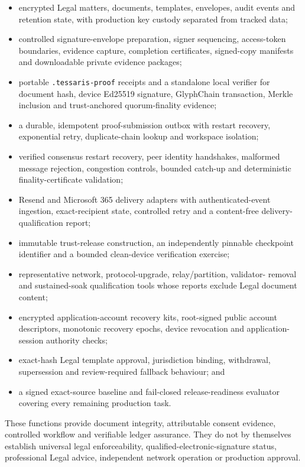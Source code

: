 \begin{itemize}
  \item encrypted Legal matters, documents, templates, envelopes, audit events and
        retention state, with production key custody separated from tracked data;
  \item controlled signature-envelope preparation, signer sequencing, access-token
        boundaries, evidence capture, completion certificates, signed-copy
        manifests and downloadable private evidence packages;
  \item portable \texttt{.tessaris-proof} receipts and a standalone local verifier
        for document hash, device Ed25519 signature, GlyphChain transaction,
        Merkle inclusion and trust-anchored quorum-finality evidence;
  \item a durable, idempotent proof-submission outbox with restart recovery,
        exponential retry, duplicate-chain lookup and workspace isolation;
  \item verified consensus restart recovery, peer identity handshakes, malformed
        message rejection, congestion controls, bounded catch-up and deterministic
        finality-certificate validation;
  \item Resend and Microsoft 365 delivery adapters with authenticated-event
        ingestion, exact-recipient state, controlled retry and a content-free
        delivery-qualification report;
  \item immutable trust-release construction, an independently pinnable checkpoint
        identifier and a bounded clean-device verification exercise;
  \item representative network, protocol-upgrade, relay/partition, validator-
        removal and sustained-soak qualification tools whose reports exclude Legal
        document content;
  \item encrypted application-account recovery kits, root-signed public account
        descriptors, monotonic recovery epochs, device revocation and application-
        session authority checks;
  \item exact-hash Legal template approval, jurisdiction binding, withdrawal,
        supersession and review-required fallback behaviour; and
  \item a signed exact-source baseline and fail-closed release-readiness evaluator
        covering every remaining production task.
\end{itemize}

These functions provide document integrity, attributable consent evidence,
controlled workflow and verifiable ledger assurance.  They do not by themselves
establish universal legal enforceability, qualified-electronic-signature status,
professional Legal advice, independent network operation or production approval.


